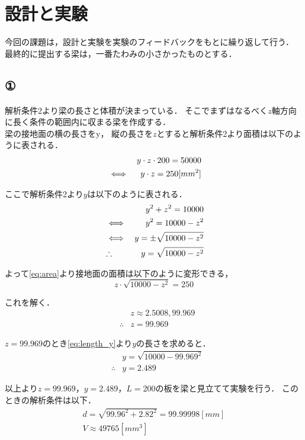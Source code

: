 \section{設計と実験}
  今回の課題は，設計と実験を実験のフィードバックをもとに繰り返して行う．
  最終的に提出する梁は，一番たわみの小さかったものとする．
  \subsection{①}
    解析条件2より梁の長さと体積が決まっている．
    そこでまずはなるべく$z$軸方向に長く条件の範囲内に収まる梁を作成する．\\\indent
    梁の接地面の横の長さをy，
    縦の長さを$z$とすると解析条件2より面積は以下のように表される．
    \begin{eqnarray}
      && y \cdot z \cdot 200 = 50000 \notag \\
      &\iff& y \cdot z = 250[mm^2] \label{eq:area}
    \end{eqnarray}
    
    ここで解析条件2より$y$は以下のように表される．
    \begin{eqnarray}
      && y^2 + z^2 = 10000 \notag \\
      &\iff& y^2 = 10000 - z^2 \notag \\
      &\iff& y = \pm \sqrt{10000-z^2} \notag \\
      &\therefore& y = \sqrt{10000-z^2} \label{eq:length_y}
    \end{eqnarray}

    よって\eqref{eq:area}より接地面の面積は以下のように変形できる，
    \begin{equation*}
      z \cdot \sqrt{10000-z^2} = 250
    \end{equation*}

    これを解く．
    \begin{eqnarray*}
      &&z  \approx 2.5008, 99.969 \\
      &\therefore &z = 99.969
    \end{eqnarray*}

    $z = 99.969$のとき\eqref{eq:length_y}より$y$の長さを求めると．\\\indent
    \begin{eqnarray*}
      && y = \sqrt{10000-99.969^2} \\
      &\therefore& y = 2.489
    \end{eqnarray*}
    
    以上より$z = 99.969，y = 2.489，L = 200$の板を梁と見立てて実験を行う．
    このときの解析条件は以下．
    \begin{gather*}
      d = \sqrt{99.96^2 + 2.82^2} = 99.99998[mm] \\
      V \approx 49765[mm^3]
    \end{gather*}

